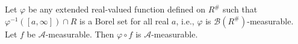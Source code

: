 Let $\varphi$ be any extended real-valued function defined on $R^{\#}$ such that $\varphi^{-1}([a, \infty]) \cap R$ is a Borel set for all real $a$, i.e., $\varphi$ is $\mathcal{B}(R^{\#})$-measurable. Let $f$ be $\mathcal{A}$-measurable. Then $\varphi \circ f$ is $\mathcal{A}$-measurable.